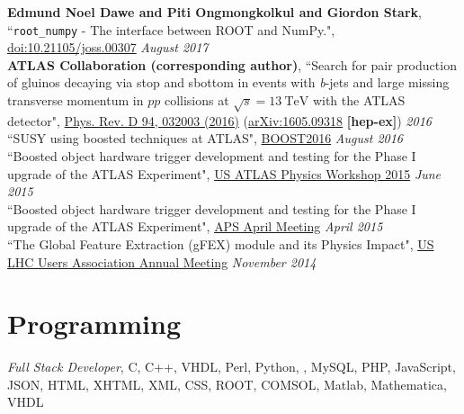 \documentclass[margin,line]{resume}
\let\origsection\section%
\let\section\subsection%
\let\section\origsection%
\begin{document}
\begin{resume}
\textbf{Edmund Noel Dawe and Piti Ongmongkolkul and Giordon Stark}, ``\texttt{root\_numpy} - The interface between ROOT and NumPy.", \href{http://joss.theoj.org/papers/10.21105/joss.00307}{doi:10.21105/joss.00307} \hfill \textsl{August 2017}\vspace{-5mm}\\%

\textbf{ATLAS Collaboration (corresponding author)}, ``Search for pair production of gluinos decaying via stop and sbottom in events with \textsl{b}-jets and large missing transverse momentum in $pp$ collisions at $\sqrt{s}=13\ \mathrm{TeV}$ with the ATLAS detector", \href{https://journals.aps.org/prd/abstract/10.1103/PhysRevD.94.032003}{Phys. Rev. D 94, 032003 (2016)} (\href{https://arxiv.org/abs/1605.09318}{arXiv:1605.09318} \textbf{[hep-ex]}) \hfill \textsl{2016}\vspace{1mm}\\%

``SUSY using boosted techniques at ATLAS", \href{https://indico.cern.ch/event/439039}{BOOST2016} \hfill \textsl{August 2016}\vspace{1mm}\\%
``Boosted object hardware trigger development and testing for the Phase I upgrade of the ATLAS Experiment", \href{https://indico.cern.ch/event/388328/timetable/?view=standard}{US ATLAS Physics Workshop 2015} \hfill \textsl{June 2015}\vspace{1mm}\\%
``Boosted object hardware trigger development and testing for the Phase I upgrade of the ATLAS Experiment", \href{http://meetings.aps.org/Meeting/APR15/Session/C16.6}{APS April Meeting} \hfill \textsl{April 2015}\vspace{1mm}\\%
``The Global Feature Extraction (gFEX) module and its Physics Impact", \href{https://indico.hep.anl.gov/indico/conferenceDisplay.py?confId=410}{US LHC Users Association Annual Meeting} \hfill \textsl{November 2014}\vspace{1mm}\\%

\section{\mysidestyle Programming}

\textsl{Full Stack Developer}, C, C++, VHDL, Perl, Python, \LaTeXe, MySQL, PHP, JavaScript, JSON, HTML, XHTML, XML, CSS, ROOT, COMSOL, Matlab, Mathematica, VHDL


\end{resume}
\end{document}

